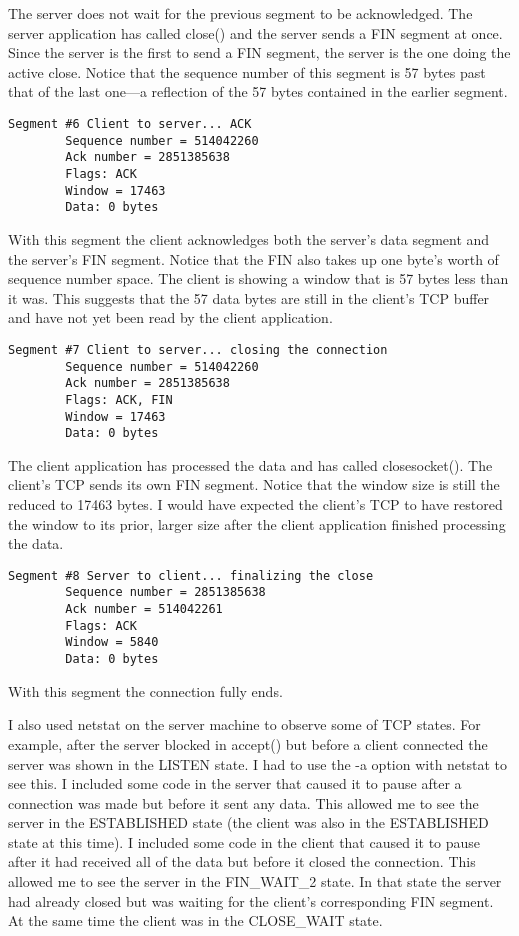 \documentclass{article}
\begin{document}
The server does not wait for the previous segment to be acknowledged. The server application has
called close() and the server sends a FIN segment at once. Since the server is the first to send
a FIN segment, the server is the one doing the active close. Notice that the sequence number of
this segment is 57 bytes past that of the last one---a reflection of the 57 bytes contained in
the earlier segment.

\begin{verbatim}
Segment #6 Client to server... ACK
        Sequence number = 514042260
        Ack number = 2851385638
        Flags: ACK
        Window = 17463
        Data: 0 bytes
\end{verbatim}

With this segment the client acknowledges both the server's data segment and the server's FIN
segment. Notice that the FIN also takes up one byte's worth of sequence number space. The client
is showing a window that is 57 bytes less than it was. This suggests that the 57 data bytes are
still in the client's TCP buffer and have not yet been read by the client application.

\begin{verbatim}
Segment #7 Client to server... closing the connection
        Sequence number = 514042260
        Ack number = 2851385638
        Flags: ACK, FIN
        Window = 17463
        Data: 0 bytes
\end{verbatim}

The client application has processed the data and has called closesocket(). The client's TCP
sends its own FIN segment. Notice that the window size is still the reduced to 17463 bytes. I
would have expected the client's TCP to have restored the window to its prior, larger size after
the client application finished processing the data.

\begin{verbatim}
Segment #8 Server to client... finalizing the close
        Sequence number = 2851385638
        Ack number = 514042261
        Flags: ACK
        Window = 5840
        Data: 0 bytes
\end{verbatim}

With this segment the connection fully ends.

I also used netstat on the server machine to observe some of TCP states. For example, after the
server blocked in accept() but before a client connected the server was shown in the LISTEN
state. I had to use the -a option with netstat to see this. I included some code in the server
that caused it to pause after a connection was made but before it sent any data. This allowed me
to see the server in the ESTABLISHED state (the client was also in the ESTABLISHED state at this
time). I included some code in the client that caused it to pause after it had received all of
the data but before it closed the connection. This allowed me to see the server in the
FIN\_WAIT\_2 state. In that state the server had already closed but was waiting for the client's
corresponding FIN segment. At the same time the client was in the CLOSE\_WAIT state.
\end{document}
